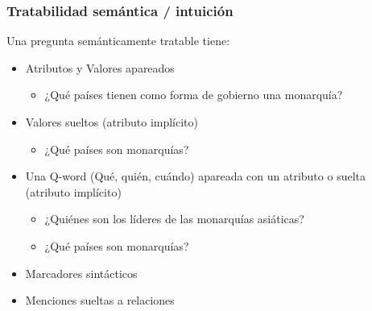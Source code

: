 \begin{frame}[<+->]
  \frametitle{Tratabilidad semántica / intuición}
    \begin{block}{Una pregunta semánticamente tratable tiene:}
      \begin{itemize}
          \item {\color{blue}Atributos} y {\color{blue}Valores} apareados
           \begin{itemize}
             \item  ¿Qué países tienen como {\color{blue}forma} de {\color{blue}gobierno} una {\color{blue}monarquía}?
           \end{itemize}
          \item {\color{red}Valores} sueltos (atributo implícito)
           \begin{itemize}
             \item ¿Qué países son {\color{red}monarquías}?
           \end{itemize}
          \item Una {\color{green}Q-word} (Qué, quién, cuándo) apareada con un atributo o suelta (atributo implícito)
          \begin{itemize}
            \item ¿{\color{green}Quiénes} son los {\color{green}líderes} de las monarquías asiáticas?
            \item ¿{\color{green}Qué} países son monarquías?
          \end{itemize}
          \item Marcadores sintácticos
          \item Menciones sueltas a {\color{orange}relaciones}
      \end{itemize}
    \end{block}
\end{frame}



